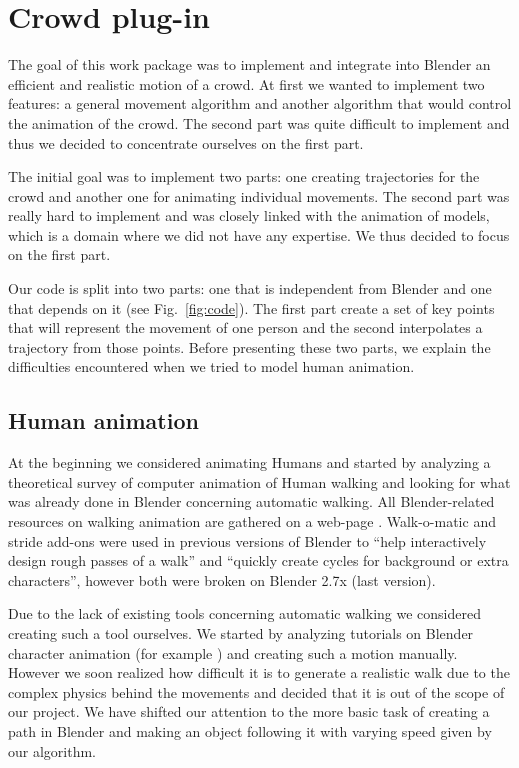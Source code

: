 \section{Crowd plug-in}

The goal of this work package was to implement and integrate into
Blender an efficient and realistic motion of a crowd. At first we
wanted to implement two features: a general movement algorithm and another
algorithm that would control the animation of the crowd. The second
part was quite difficult to implement and thus we decided to
concentrate ourselves on the first part.


The initial goal was to implement two parts: one creating trajectories
for the crowd and another one for animating individual movements. The
second part was really hard to implement and was closely linked with
the animation of models, which is a domain where we did not have any
expertise. We thus decided to focus on the first part.


Our code is split into two parts: one that is independent from Blender
and one that depends on it (see Fig.~\ref{fig:code}). The first part
create a set of key points that will represent the movement of one
person and the second interpolates a trajectory from those
points. Before presenting these two parts, we explain the difficulties
encountered when we tried to model human animation.


\subsection{Human animation}

At the beginning we considered animating Humans and started by
analyzing a theoretical survey of computer animation of Human walking
\cite{th_walking} and looking for what was already done in Blender
concerning automatic walking. All Blender-related resources on walking
animation are gathered on a web-page
\cite{blwikiwalking}. Walk-o-matic and stride add-ons were used in
previous versions of Blender to ``help interactively design rough
passes of a walk'' and ``quickly create cycles for background or extra
characters'', however both were broken on Blender 2.7x (last version).

Due to the lack of existing tools concerning automatic walking we
considered creating such a tool ourselves. We started by analyzing
tutorials on Blender character animation (for example
\cite{tuto_walk}) and creating such a motion manually. However we soon
realized how difficult it is to generate a realistic walk due to the
complex physics behind the movements and decided that it is out of the
scope of our project. We have shifted our attention to the more basic
task of creating a path in Blender and making an object following it
with varying speed given by our algorithm.


